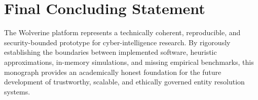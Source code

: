 \section{Final Concluding Statement}
\label{sec:concl-closing}
The Wolverine platform represents a technically coherent, reproducible, and security-bounded prototype for cyber-intelligence research. By rigorously establishing the boundaries between implemented software, heuristic approximations, in-memory simulations, and missing empirical benchmarks, this monograph provides an academically honest foundation for the future development of trustworthy, scalable, and ethically governed entity resolution systems.
